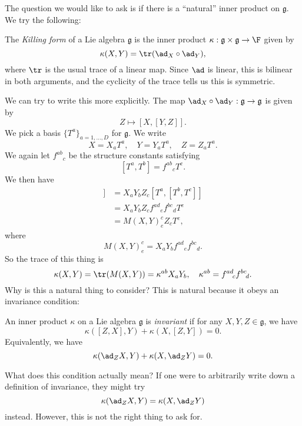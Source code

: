 \documentclass[a4paper]{article}
\begin{document}
The question we would like to ask is if there is a ``natural'' inner product on $\mathfrak{g}$. We try the following:

\begin{defi}
  The \emph{Killing form} of a Lie algebra $\mathfrak{g}$ is the inner product $\kappa: \mathfrak{g} \times \mathfrak{g} \to \F$ given by
  \[
    \kappa(X, Y) = \tr(\ad_X \circ \ad_Y),
  \]
  where $\tr$ is the usual trace of a linear map. Since $\ad$ is linear, this is bilinear in both arguments, and the cyclicity of the trace tells us this is symmetric.
\end{defi}

We can try to write this more explicitly. The map $\ad_X \circ \ad_Y: \mathfrak{g} \to \mathfrak{g}$ is given by
\[
  Z \mapsto [X, [Y, Z]].
\]
We pick a basis $\{T^a\}_{a = 1, \ldots, D}$ for $\mathfrak{g}$. We write
\[
  X = X_aT^a,\quad Y = Y_aT^a,\quad Z = Z_aT^a.
\]
We again let $f^{ab}\!_c$ be the structure constants satisfying
\[
  [T^a, T^b] = f^{ab}\!_c T^c.
\]
We then have
\begin{align*}
  [X, [Y, Z]] &= X_a Y_b Z_ c [T^a, [T^b, T^c]]\\
  &= X_a Y_b Z_c f^{ad}\!_e f^{bc}\!_d T^e\\
  &= M(X, Y)^c_e Z_c T^e,
\end{align*}
where
\[
  M(X, Y)^c_e = X_a Y_b f^{ad}\!_e f^{bc}\!_d.
\]
So the trace of this thing is
\[
  \kappa(X, Y) = \tr(M(X, Y)) = \kappa^{ab}X_a Y_b,\quad \kappa^{ab} = f^{ad}\!_c f^{bc}\!_d.
\]
Why is this a natural thing to consider? This is natural because it obeys an invariance condition:
\begin{defi}
  An inner product $\kappa$ on a Lie algebra $\mathfrak{g}$ is \emph{invariant} if for any $X, Y, Z \in \mathfrak{g}$, we have
  \[
    \kappa([Z, X], Y)+ \kappa(X, [Z, Y]) = 0.
  \]
  Equivalently, we have
  \[
    \kappa(\ad_Z X, Y) + \kappa(X, \ad_Z Y) = 0.
  \]
\end{defi}
What does this condition actually mean? If one were to arbitrarily write down a definition of invariance, they might try
\[
  \kappa(\ad_Z X, Y) = \kappa(X, \ad_Z Y)
\]
instead. However, this is not the right thing to ask for.
\end{document}
